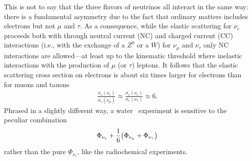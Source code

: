 \begin{marginfigure}
\caption{Feynman diagrams for neutral- and charged-current interactions neutrino
  elastic scattering on electrons.}
\end{marginfigure}

This is not to say that the three flavors of neutrinos all interact in the same way:
there is a fundamental asymmetry due to the fact that ordinary matters includes
electrons but not $\mu$ and $\tau$. As a consequence, while the elastic scattering
for $\nu_e$ proceeds both with through neutral current (NC) and charged current (CC)
interactions (i.e., with the exchange of a $Z^0$ or a $W$) for $\nu_\mu$ and
$\nu_\tau$ only NC interactions are allowed---at least up to the kinematic threshold
where inelastic interactions with the production of $\mu$ (or $\tau$) leptons.
It follows that the elastic scattering cross section on electrons is about six times
larger for electrons than for muons and tauons
\begin{align*}
  \frac{\sigma_e(\nu_e)}{\sigma_e(\nu_\mu)} \approx
  \frac{\sigma_e(\nu_e)}{\sigma_e(\nu_\tau)} \approx 6.
\end{align*}
Phrased in a slightly different way, a water \cherenkov\ experiment is sensitive to
the peculiar combination
\begin{align*}
  \Phi_{\nu_e} + \frac{1}{6} \qty(\Phi_{\nu_\mu} + \Phi_{\nu_\tau})
\end{align*}
rather than the pure $\Phi_{\nu_e}$, like the radiochemical experiments.

